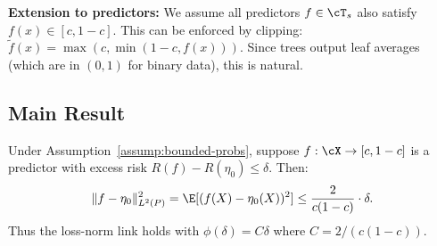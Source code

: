\textbf{Extension to predictors:} We assume all predictors $f \in \cT_s$ also satisfy $f(x) \in [c, 1-c]$. This can be enforced by clipping: $\tilde{f}(x) = \max(c, \min(1-c, f(x)))$. Since trees output leaf averages (which are in $(0,1)$ for binary data), this is natural.

\subsection{Main Result}

\begin{lemma}
\label{lem:ce-loss-norm}
Under Assumption~\ref{assump:bounded-probs}, suppose $f: \cX \to [c, 1-c]$ is a predictor with excess risk $R(f) - R(\eta_0) \le \delta$. Then:
\[
\|f - \eta_0\|_{L^2(P)}^2 = \E[(f(X) - \eta_0(X))^2] \le \frac{2}{c(1-c)} \cdot \delta.
\]
Thus the loss-norm link holds with $\phi(\delta) = C\delta$ where $C = 2/(c(1-c))$.
\end{lemma}

